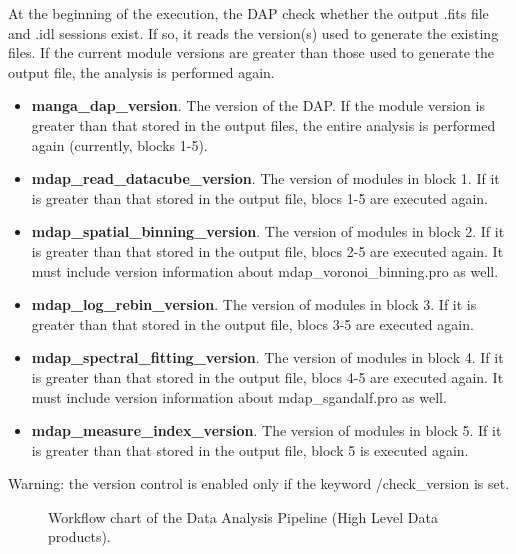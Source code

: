 \documentclass[11pt]{book}
\begin{document}
At the beginning of the execution, the DAP check whether the output
.fits file and .idl sessions exist. If so, it reads the version(s)
used to generate the existing files. If the current module versions
are greater than those used to generate the output file, the analysis
is performed again. 

\begin{itemize}
\item {\bf manga\_dap\_version}. The version of the DAP. If the module
  version is greater than that stored in the output files, the entire
  analysis is performed again (currently, blocks 1-5).
\item {\bf mdap\_read\_datacube\_version}. The version of modules in
  block 1. If it is greater than that stored in the output file, blocs
  1-5 are executed again.

\item {\bf mdap\_spatial\_binning\_version}. The version of modules in
  block 2. If it is greater than that stored in the output file, blocs
  2-5 are executed again. It must include version information about
  mdap\_voronoi\_binning.pro as well.

\item {\bf mdap\_log\_rebin\_version}. The version of modules in
  block 3. If it is greater than that stored in the output file, blocs
  3-5 are executed again.

\item {\bf mdap\_spectral\_fitting\_version}. The version of modules
  in block 4. If it is greater than that stored in the output file,
  blocs 4-5 are executed again. It must include version information
  about mdap\_sgandalf.pro as well.

\item {\bf mdap\_measure\_index\_version}. The version of modules in
  block 5. If it is greater than that stored in the output file, block
  5 is executed again.

\end{itemize}

Warning: the version control is enabled only if the keyword /check\_version is set.

\begin{figure}
\begin{center}
\caption{Workflow chart of the Data Analysis Pipeline (High Level Data products).}
 \label{dap_fig:dap_workflow_1}
\end{center}
\end{figure}
\end{document}
